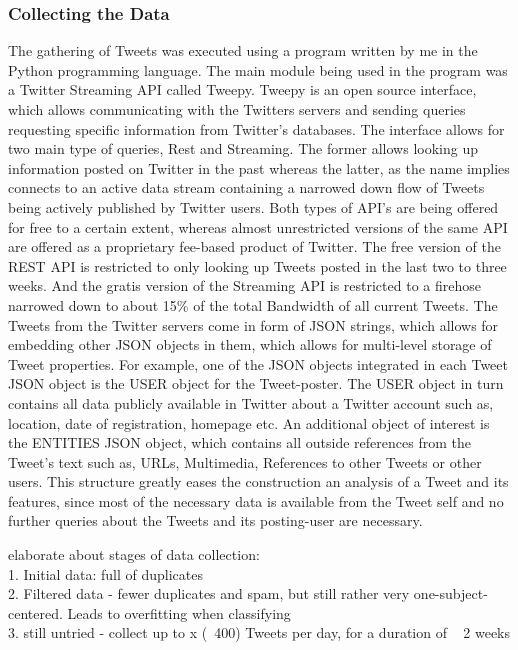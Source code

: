 		\subsubsection*{Collecting the Data}
		\label{sec:collectdata}
		The gathering of Tweets was executed using a program written by me in the Python programming language. The main module being used in the program was a Twitter Streaming API called Tweepy. Tweepy is an open source interface, which allows communicating with the Twitters servers and sending queries requesting specific information from Twitter's databases. The interface allows for two main type of queries, Rest and Streaming. The former allows looking up information posted on Twitter in the past whereas the latter, as the name implies connects to an active data stream containing a narrowed down flow of Tweets being actively published by Twitter users. Both types of API's are being offered for free to a certain extent, whereas almost unrestricted versions of the same API are offered as a proprietary fee-based product of Twitter. The free version of the REST API is restricted to only looking up Tweets posted in the last two to three weeks. And the gratis version of the Streaming API is restricted to a firehose narrowed down to about 15\% of the total Bandwidth of all current Tweets.
		The Tweets from the Twitter servers come in form of JSON strings, which allows for embedding other JSON objects in them, which allows for multi-level storage of Tweet properties. For example, one of the JSON objects integrated in each Tweet JSON object is the USER object for the Tweet-poster. The USER object in turn contains all data publicly available in Twitter about a Twitter account such as, location, date of registration, homepage etc. An additional object of interest is the ENTITIES JSON object, which contains all outside references from the Tweet's text such as, URLs, Multimedia, References to other Tweets or other users. 
		This structure greatly eases the construction an analysis of a Tweet and its features, since most of the necessary data is available from the Tweet self and no further queries about the Tweets and its posting-user are necessary.
		\par
		{\LARGE \color{red}
			elaborate about stages of data collection:
		} \\ 
		{\color{red}
			1. Initial data: full of duplicates\\
			2. Filtered data - fewer duplicates and spam, but still rather very one-subject-centered. Leads to overfitting when classifying \\
			3. still untried - collect up to x (~400) Tweets per day, for a duration of ~ 2 weeks
		}
		
